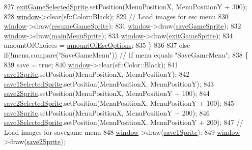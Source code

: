 \begin{DoxyCode}
827             \hyperlink{classTestApp_a2b07fb8cf4cb37fc1da99f91fa1543ed}{exitGameSelectedSprite}.setPosition(MenuPositionX, MenuPositionY + 300);
828             \hyperlink{classTestApp_a0b6b080a777092db64519ef7c4309105}{window}->clear(sf::Color::Black);
829             \textcolor{comment}{// Load images for esc menu}
830             \hyperlink{classTestApp_a0b6b080a777092db64519ef7c4309105}{window}->draw(\hyperlink{classTestApp_a9d080e34bbede4ba5e6c6423ef34fd91}{resumeGameSprite});
831             \hyperlink{classTestApp_a0b6b080a777092db64519ef7c4309105}{window}->draw(\hyperlink{classTestApp_ac41e21b394f9e3e448503aa4afecf169}{saveGameSprite});
832             \hyperlink{classTestApp_a0b6b080a777092db64519ef7c4309105}{window}->draw(\hyperlink{classTestApp_a052722ceb28f1f2158513869d135057e}{mainMenuSprite});
833             \hyperlink{classTestApp_a0b6b080a777092db64519ef7c4309105}{window}->draw(\hyperlink{classTestApp_a55bf93b6dbf3838aacc67f652a3ff48d}{exitGameSprite});
834             amountOfChoices = \hyperlink{classTestApp_a06f690797d69d08919e18257301b4e04}{amountOfEscOptions};
835         \}
836 
837         \textcolor{keywordflow}{else} \textcolor{keywordflow}{if}(!menu.compare(\textcolor{stringliteral}{"SaveGameMenu"})) \textcolor{comment}{// If menu equals "SaveGameMenu";}
838         \{
839             save = \textcolor{keyword}{true};
840             \hyperlink{classTestApp_a0b6b080a777092db64519ef7c4309105}{window}->clear(sf::Color::Black);
841             \hyperlink{classTestApp_a1d85fde65bc3295c4c57c25d33443110}{save1Sprite}.setPosition(MenuPositionX, MenuPositionY);
842             \hyperlink{classTestApp_ab1a8df80e966426fff373616793957aa}{save1SelectedSprite}.setPosition(MenuPositionX, MenuPositionY);
843             \hyperlink{classTestApp_ac6cd1deedf91c5eb334c7581e6097db9}{save2Sprite}.setPosition(MenuPositionX, MenuPositionY + 100);
844             \hyperlink{classTestApp_a032687def201e3842bbfc93cc5c0756b}{save2SelectedSprite}.setPosition(MenuPositionX, MenuPositionY + 100);
845             \hyperlink{classTestApp_ade14eb2632645674f9c699fe0ede8e56}{save3Sprite}.setPosition(MenuPositionX, MenuPositionY + 200);
846             \hyperlink{classTestApp_ac1b6f39fe33e9eeca2167ab0127de161}{save3SelectedSprite}.setPosition(MenuPositionX, MenuPositionY + 200);
847             \textcolor{comment}{// Load images for savegame menu}
848             \hyperlink{classTestApp_a0b6b080a777092db64519ef7c4309105}{window}->draw(\hyperlink{classTestApp_a1d85fde65bc3295c4c57c25d33443110}{save1Sprite});
849             \hyperlink{classTestApp_a0b6b080a777092db64519ef7c4309105}{window}->draw(\hyperlink{classTestApp_ac6cd1deedf91c5eb334c7581e6097db9}{save2Sprite});

\end{DoxyCode}
